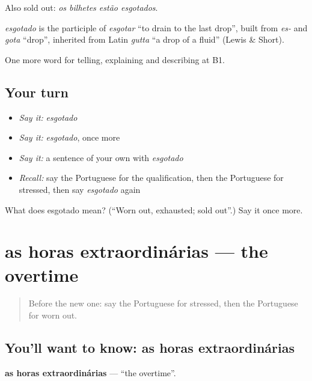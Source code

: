 Also sold out: \emph{os bilhetes estão esgotados}.

\begin{cousinweb}
\emph{esgotado} is the participle of \emph{esgotar} \textquotedblleft{}to drain to the last drop\textquotedblright{}, built from \emph{es-} and \emph{gota} \textquotedblleft{}drop\textquotedblright{}, inherited from Latin \emph{gutta} \textquotedblleft{}a drop of a fluid\textquotedblright{} (Lewis \& Short).
\end{cousinweb}

\begin{grammarlens}[title={What you've built}]
One more word for telling, explaining and describing at B1.
\end{grammarlens}

\subsection*{Your turn}
\begin{itemize}
\raggedright
  \item \emph{Say it:} \emph{esgotado}
  \item \emph{Say it:} \emph{esgotado}, once more
  \item \emph{Say it:} a sentence of your own with \emph{esgotado}
  \item \emph{Recall:} say the Portuguese for the qualification, then the Portuguese for stressed, then say \emph{esgotado} again
\end{itemize}

\begin{tcolorbox}[breakable,colback=teal!4,colframe=teal!35!black,title={Before you move on}]
What does esgotado mean? (\textquotedblleft{}Worn out, exhausted; sold out\textquotedblright{}.) Say it once more.
\end{tcolorbox}
\section[as horas extraordinárias]{as horas extraordinárias — the overtime}

\label{lesson:PT-C361-horas-extraordinarias}



\begin{quote}
Before the new one: say the Portuguese for stressed, then the Portuguese for worn out.
\end{quote}

\subsection*{You'll want to know: as horas extraordinárias}
\textbf{as horas extraordinárias} — \textquotedblleft{}the overtime\textquotedblright{}.

